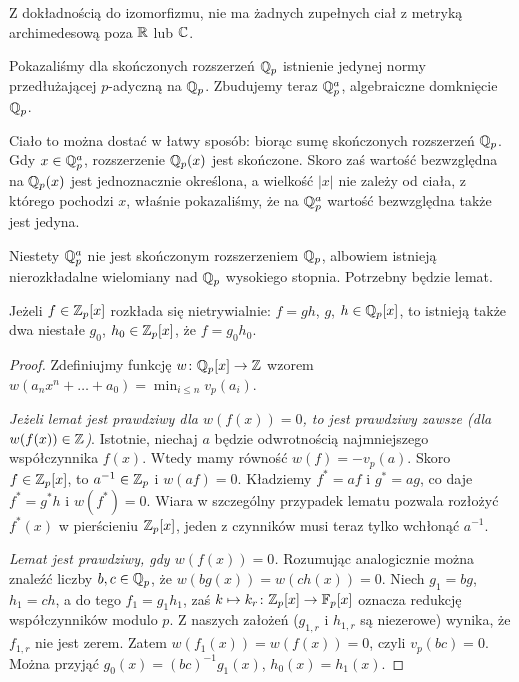 \begin{fakt}
	Z dokładnością do izomorfizmu, nie ma żadnych zupełnych ciał z metryką archimedesową poza $\mathbb R$ lub $\mathbb C$.
\end{fakt}

Pokazaliśmy dla skończonych rozszerzeń $\mathbb Q_p$ istnienie jedynej normy przedłużającej $p$-adyczną na $\mathbb Q_p$.
Zbudujemy teraz $\mathbb Q_p^a$, algebraiczne domknięcie $\mathbb Q_p$.

Ciało to można dostać w łatwy sposób: biorąc sumę skończonych rozszerzeń $\mathbb Q_p$.
Gdy $x \in \mathbb Q_p^a$, rozszerzenie $\mathbb Q_p(x)$ jest skończone.
Skoro zaś wartość bezwzględna na $\mathbb Q_p(x)$ jest jednoznacznie określona, a wielkość $|x|$ nie zależy od ciała, z którego pochodzi $x$, właśnie pokazaliśmy, że na $\mathbb Q_p^a$ wartość bezwzględna także jest jedyna.	

Niestety $\mathbb Q_p^a$ nie jest skończonym rozszerzeniem $\mathbb Q_p$, albowiem istnieją nierozkładalne wielomiany nad $\mathbb Q_p$ wysokiego stopnia.
Potrzebny będzie lemat.

\begin{lemat}
	Jeżeli $f \in \mathbb Z_p[x]$ rozkłada się nietrywialnie: $f = gh$, $g$, $h \in \mathbb Q_p[x]$, to istnieją także dwa niestałe $g_0$, $h_0 \in \mathbb Z_p[x]$, że $f = g_0 h_0$.
\end{lemat}

\begin{proof}
	Zdefiniujmy funkcję $w \colon \mathbb Q_p[x] \to \mathbb Z$ wzorem $w(a_nx^n + \ldots + a_0) = \min_{i\le n} v_p(a_i)$.

	\emph{Jeżeli lemat jest prawdziwy dla $w(f(x)) = 0$, to jest prawdziwy zawsze (dla $w(f(x)) \in \mathbb Z$)}.
	Istotnie, niechaj $a$ będzie odwrotnością najmniejszego współczynnika $f(x)$.
	Wtedy mamy równość $w(f) = -v_p(a)$.
	Skoro $f \in \mathbb Z_p[x]$, to $a^{-1} \in \mathbb Z_p$ i $w(af) = 0$.
	Kładziemy $f^* = af$ i $g^* = ag$, co daje $f^* = g^*h$ i $w(f^*) = 0$.
	Wiara w szczególny przypadek lematu pozwala rozłożyć $f^*(x)$ w pierścieniu $\mathbb Z_p[x]$, jeden z czynników musi teraz tylko wchłonąć $a^{-1}$.

	\emph{Lemat jest prawdziwy, gdy $w(f(x)) = 0$.}
	Rozumując analogicznie można znaleźć liczby $b,c \in \mathbb Q_p$, że $w(bg(x)) = w(ch(x)) = 0$.
	Niech $g_1 = bg$, $h_1 = ch$, a do tego $f_1 = g_1 h_1$, zaś $k \mapsto k_r \colon \mathbb Z_p[x] \to \mathbb F_p[x]$ oznacza redukcję współczynników modulo $p$.
	Z naszych założeń ($g_{1,r}$ i $h_{1,r}$ są niezerowe) wynika, że $f_{1,r}$ nie jest zerem.
	Zatem $w(f_1(x)) = w(f(x)) = 0$, czyli $v_p(bc) = 0$.
	Można przyjąć $g_0(x) = (bc)^{-1}g_1(x)$, $h_0(x) = h_1(x)$.
\end{proof}


